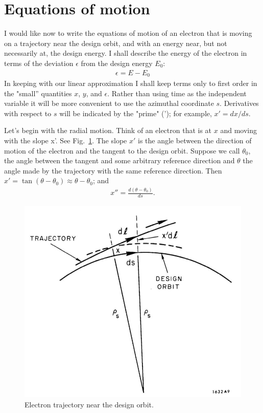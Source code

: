 \section{Equations of motion}\label{sec:2.3}
I would like now to write the equations of motion of an electron that is moving on a trajectory near the design orbit, and with an energy near, but not necessarily at, the design energy. I shall describe the energy of the electron in terms of the deviation $\epsilon$ from the design energy $E_0$:
\begin{align}
	\epsilon = E-E_0
\end{align}
In keeping with our linear approximation I shall keep terms only to first order in the "small” quantities $x$, $y$, and $\epsilon$. Rather than using time as the independent variable it will be more convenient to use the azimuthal coordinate $s$. Derivatives with respect to $s$ will be indicated by the "prime" ('); for example, $x' = dx/ds$.

Let’s begin with the radial motion. Think of an electron that is at $x$ and moving with the slope x’. See Fig.~\ref{fig:fig9}. The slope $x'$ is the angle between the direction of motion of the electron and the tangent to the design orbit. Suppose we call $\theta_0$, the angle between the tangent and some arbitrary reference direction and $\theta$ the angle made by the trajectory with the same reference direction. Then $x' = \tan(\theta - \theta_0) \approx \theta - \theta_0$; and
\begin{align} \label{eq:2.12}
	x'' = \frac{d(\theta-\theta_0)}{ds}.
\end{align}

\begin{figure}[!htb]
	\centering
	\includegraphics[width=0.6\linewidth]{./Figuras/fig09.jpeg}
	\caption{Electron trajectory near the design orbit.}
	\label{fig:fig9}
\end{figure}

